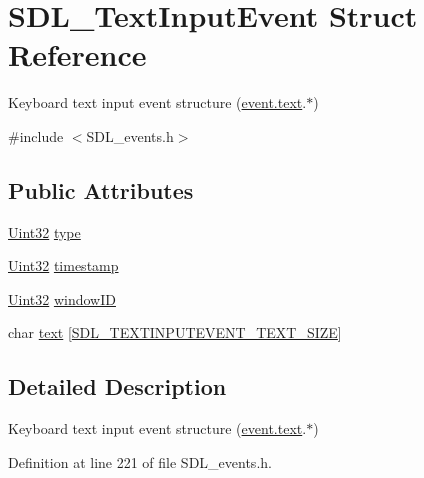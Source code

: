 \hypertarget{struct_s_d_l___text_input_event}{\section{S\-D\-L\-\_\-\-Text\-Input\-Event Struct Reference}
\label{struct_s_d_l___text_input_event}
}


Keyboard text input event structure (\hyperlink{union_s_d_l___event_aa4fc65c559d69f33c057c0c23d8414b8}{event.\-text}.$\ast$)  




{\ttfamily \#include $<$S\-D\-L\-\_\-events.\-h$>$}

\subsection*{Public Attributes}
\begin{DoxyCompactItemize}
\item 
\hyperlink{_s_d_l__stdinc_8h_add440eff171ea5f55cb00c4a9ab8672d}{Uint32} \hyperlink{struct_s_d_l___text_input_event_a90576be2ea52e694deff40d0586654f5}{type}
\item 
\hyperlink{_s_d_l__stdinc_8h_add440eff171ea5f55cb00c4a9ab8672d}{Uint32} \hyperlink{struct_s_d_l___text_input_event_a20b190a96494918690ea7f99187be948}{timestamp}
\item 
\hyperlink{_s_d_l__stdinc_8h_add440eff171ea5f55cb00c4a9ab8672d}{Uint32} \hyperlink{struct_s_d_l___text_input_event_aeb4f7a939353990ca40261ffbfbeb3d0}{window\-I\-D}
\item 
char \hyperlink{struct_s_d_l___text_input_event_a1a95531f466dff01c2f108f53ff24554}{text} \mbox{[}\hyperlink{_s_d_l__events_8h_a43822437fd5e89c1da1841a813cad4aa}{S\-D\-L\-\_\-\-T\-E\-X\-T\-I\-N\-P\-U\-T\-E\-V\-E\-N\-T\-\_\-\-T\-E\-X\-T\-\_\-\-S\-I\-Z\-E}\mbox{]}
\end{DoxyCompactItemize}


\subsection{Detailed Description}
Keyboard text input event structure (\hyperlink{union_s_d_l___event_aa4fc65c559d69f33c057c0c23d8414b8}{event.\-text}.$\ast$) 

Definition at line 221 of file S\-D\-L\-\_\-events.\-h.



